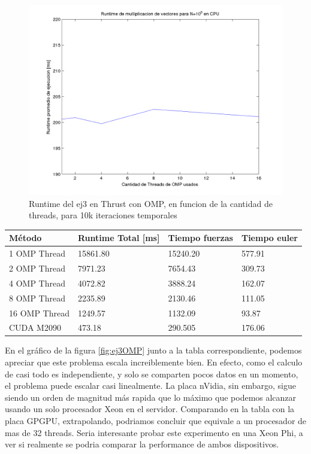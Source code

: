  \begin{figure}[H]
 \begin {center}
 \includegraphics[width=\hrwidth]{plots/ej1omp.png}
 \end {center}
 \caption{Runtime del ej3 en Thrust con OMP, en funcion de la cantidad de threads, para 10k iteraciones temporales}
 \label{fig:ej1OMP}
 \end{figure}

 \begin{table} [H]
    \begin{tabular}{l|l|l|l}
        \textbf{M\'etodo} & \textbf{ Runtime Total [ms] }& \textbf{Tiempo fuerzas} & \textbf{Tiempo euler}\\ \hline
        1 OMP Thread         & 15861.80      & 15240.20  & 577.91\\
   2 OMP Thread          & 7971.23     & 7654.43 &309.73  \\
   4 OMP Thread          & 4072.82     & 3888.24 & 162.07 \\
   8 OMP Thread  & 2235.89     & 2130.46 & 111.05 \\
   16 OMP Thread & 1249.57     & 1132.09 & 93.87 \\
       CUDA M2090 & 473.18  & 290.505 & 176.06
   \end{tabular}
   
\end{table}


En el gr\'afico de la figura \ref{fig:ej3OMP} junto a la tabla correspondiente, podemos apreciar que este problema escala
increiblemente bien. En efecto, como el calculo de casi todo es independiente, y solo se comparten pocos datos en un momento,
el problema puede escalar casi linealmente. La placa nVidia, sin embargo, sigue siendo un orden de magnitud m\'as rapida que
lo m\'aximo que podemos alcanzar usando un solo procesador Xeon en el servidor.
Comparando en la tabla con la placa GPGPU, extrapolando, podriamos concluir que equivale a un procesador de mas de 32 threads. 
Seria interesante probar este experimento en una Xeon Phi, a ver si realmente se podria comparar la performance de ambos dispositivos.

